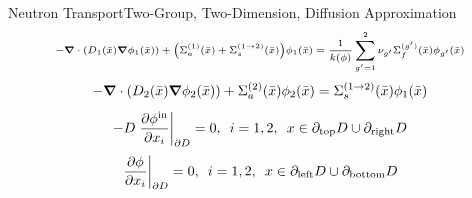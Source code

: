 \documentclass{beamer}
\newcommand{\xs}[2]{\ensuremath{\Sigma_{#1}^{(#2)}}}
\begin{document}
\begin{frame}{Neutron Transport}{Two-Group, Two-Dimension, Diffusion Approximation}
\vspace{-30pt}
\begin{equation} \scriptsize
-\grad\cdot\qty( D_1(\bar x)\grad\phi_1(\bar x))+\qty(\xs{a}{1}(\bar x)+\xs{s}{1\to2}(\bar x))\phi_1(\bar x) = \frac{1}{k(\phi)}\sum_{g'=1}^2\nu_{g'}\xs{f}{g'}(\bar x)\phi_{g'}(\bar x) \nonumber
\end{equation}
\begin{equation}
-\grad \cdot\qty(D_2(\bar x)\grad \phi_2(\bar x))+\xs{a}{2}(\bar x)\phi_2(\bar x) = \xs{s}{1\to 2}(\bar x)\phi_1(\bar x)\nonumber
\end{equation}
\vspace{20pt}
\begin{equation}
-D\eval{\pdv{\phi^{\text{in}}}{x_i}}_{\partial D}=0,\hspace{5pt}i=1,2,\hspace{5pt}
    x\in\partial_\text{top}D\cup\partial_\text{right}D\nonumber
\end{equation}
\begin{equation}
\eval{\pdv{\phi}{x_i}}_{\partial D}=0,\hspace{5pt}i=1,2,\hspace{5pt}
    x\in\partial_\text{left}D\cup\partial_\text{bottom}D\nonumber
\end{equation}
\end{frame}

\end{document}
